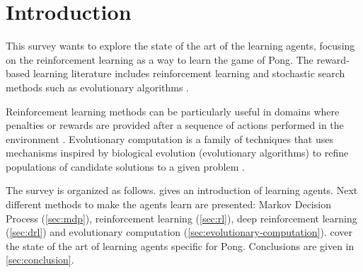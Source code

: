 \section{Introduction}
This survey wants to explore the state of the art of the learning agents, focusing on the reinforcement learning as a way to learn the game of Pong.
%
The reward-based learning literature includes reinforcement learning and stochastic search methods such as evolutionary algorithms \cite{panait2005cooperative}.

Reinforcement learning methods can be particularly useful in domains where penalties or rewards are provided after a sequence of actions performed in the environment \cite{panait2005cooperative}.
%
Evolutionary computation is a family of techniques that uses mechanisms inspired by biological evolution (evolutionary algorithms) to refine populations of candidate solutions to a given problem \cite{vikhar2016evolutionary}.

The survey is organized as follows.  gives an introduction of learning agents.
Next different methods to make the agents learn are presented: 
Markov Decision Process (\cref{sec:mdp}), reinforcement learning (\cref{sec:rl}), deep reinforcement learning (\cref{sec:drl}) and evolutionary computation (\cref{sec:evolutionary-computation}).
 cover the state of the art of learning agents specific for Pong. 
Conclusions are given in \cref{sec:conclusion}.  
